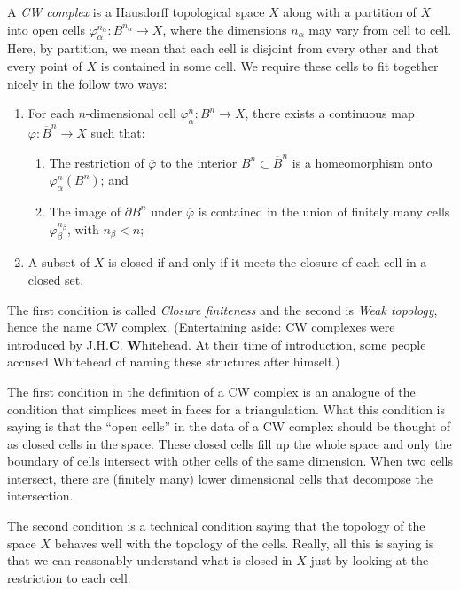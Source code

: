 \documentclass{axolotl}
\begin{document}
A \emph{CW complex} is a Hausdorff topological space \(X\) along with a
partition of \(X\) into open cells \(\varphi_\alpha^{n_\alpha}: B^{n_\alpha}
  \to X\), where the dimensions \(n_\alpha\) may vary from cell to cell. Here,
by partition, we mean that each cell is disjoint from every other and that every
point of \(X\) is contained in some cell. We require these cells to fit together
nicely in the follow two ways:
\begin{enumerate}
  \item For each \(n\)-dimensional cell \(\varphi_\alpha^n: B^n \to X\), there
    exists a continuous map \(\overline\varphi: \overline B^n \to X\) such that:
    \begin{enumerate}
      \item The restriction of \(\overline\varphi\) to the interior \(B^n
          \subset \overline B^n\) is a homeomorphism onto
        \(\varphi_\alpha^n(B^n)\); and
      \item The image of \(\partial B^n\) under \(\overline\varphi\) is contained
        in the union of finitely many cells \(\varphi^{n_\beta}_\beta\), with
        \(n_\beta < n\);
    \end{enumerate}
  \item A subset of \(X\) is closed if and only if it meets the closure of each
    cell in a closed set.
\end{enumerate}
The first condition is called \emph{Closure finiteness} and the second is
\emph{Weak topology}, hence the name CW complex. (Entertaining aside: CW
complexes were introduced by J.H.\textbf{C}. \textbf{W}hitehead. At their time
of introduction, some people accused Whitehead of naming these structures after
himself.)

The first condition in the definition of a CW complex is an analogue of the
condition that simplices meet in faces for a triangulation. What this condition
is saying is that the ``open cells'' in the data of a CW complex should be
thought of as closed cells in the space. These closed cells fill up the whole
space and only the boundary of cells intersect with other cells of the same
dimension. When two cells intersect, there are (finitely many) lower
dimensional cells that decompose the intersection.

The second condition is a technical condition saying that the topology of the
space \(X\) behaves well with the topology of the cells. Really, all this is
saying is that we can reasonably understand what is closed in \(X\) just by
looking at the restriction to each cell.
\end{document}
